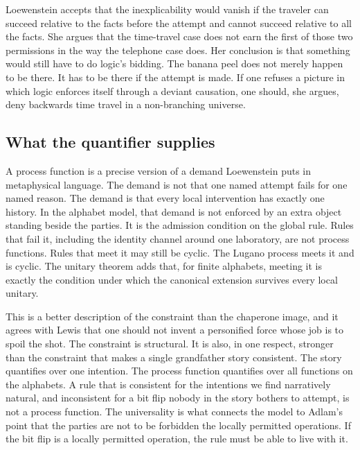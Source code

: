 \documentclass[11pt]{article}
\begin{document}
Loewenstein accepts that the inexplicability would vanish if the traveler can succeed relative to the facts before the attempt and cannot succeed relative to all the facts. She argues that the time-travel case does not earn the first of those two permissions in the way the telephone case does. Her conclusion is that something would still have to do logic's bidding. The banana peel does not merely happen to be there. It has to be there if the attempt is made. If one refuses a picture in which logic enforces itself through a deviant causation, one should, she argues, deny backwards time travel in a non-branching universe.

\subsection{What the quantifier supplies}
\label{sec:quant}

A process function is a precise version of a demand Loewenstein puts in metaphysical language. The demand is not that one named attempt fails for one named reason. The demand is that every local intervention has exactly one history. In the alphabet model, that demand is not enforced by an extra object standing beside the parties. It is the admission condition on the global rule. Rules that fail it, including the identity channel around one laboratory, are not process functions. Rules that meet it may still be cyclic. The Lugano process meets it and is cyclic. The unitary theorem adds that, for finite alphabets, meeting it is exactly the condition under which the canonical extension survives every local unitary.

This is a better description of the constraint than the chaperone image, and it agrees with Lewis that one should not invent a personified force whose job is to spoil the shot. The constraint is structural. It is also, in one respect, stronger than the constraint that makes a single grandfather story consistent. The story quantifies over one intention. The process function quantifies over all functions on the alphabets. A rule that is consistent for the intentions we find narratively natural, and inconsistent for a bit flip nobody in the story bothers to attempt, is not a process function. The universality is what connects the model to Adlam's point that the parties are not to be forbidden the locally permitted operations. If the bit flip is a locally permitted operation, the rule must be able to live with it.
\end{document}
